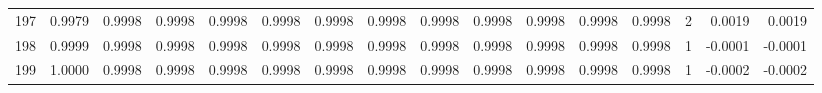 \begin{tabular}{lrrrrrrrrrrrrrrr}
197 &      0.9979 &  0.9998 &  0.9998 &  0.9998 &  0.9998 &  0.9998 &  0.9998 &  0.9998 &  0.9998 &  0.9998 &   0.9998 &     0.9998 &      2 &                    0.0019 &                     0.0019 \\
198 &      0.9999 &  0.9998 &  0.9998 &  0.9998 &  0.9998 &  0.9998 &  0.9998 &  0.9998 &  0.9998 &  0.9998 &   0.9998 &     0.9998 &      1 &                   -0.0001 &                    -0.0001 \\
199 &      1.0000 &  0.9998 &  0.9998 &  0.9998 &  0.9998 &  0.9998 &  0.9998 &  0.9998 &  0.9998 &  0.9998 &   0.9998 &     0.9998 &      1 &                   -0.0002 &                    -0.0002 \\
\bottomrule
\end{tabular}
